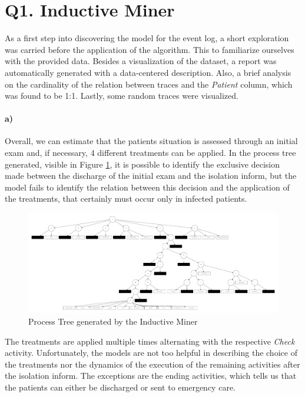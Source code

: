 \documentclass[12pt]{report}
\begin{document}
\section{Q1. Inductive Miner}

As a first step into discovering the model for the event log, a short exploration was carried before the application of the algorithm. This to familiarize ourselves with the provided data. Besides a visualization of the dataset, a report was automatically generated with a data-centered description. Also, a brief analysis on the cardinality of the relation between traces and the \emph{Patient} column, which was found to be 1:1. Lastly, some random traces were visualized.

\paragraph{a)} 

Overall, we can estimate that the patients situation is assessed through an initial exam and, if necessary, 4 different treatments can be applied. In the process tree generated, visible in Figure \ref{fig:figures-q1_a_tree-pdf}, it is possible to identify the exclusive decision made between the discharge of the initial exam and the isolation inform, but the model fails to identify the relation between this decision and the application of the treatments, that certainly must occur only in infected patients.

\begin{figure}[h]
    \centering
    \includegraphics[width=\textwidth]{figures/q1_a_tree.pdf}
    \caption{Process Tree generated by the Inductive Miner}
    \label{fig:figures-q1_a_tree-pdf}
\end{figure}

The treatments are applied multiple times alternating with the respective \emph{Check} activity. Unfortunately, the models are not too helpful in describing the choice of the treatments nor the dynamics of the execution of the remaining activities after the isolation inform. The exceptions are the ending activities, which tells us that the patients can either be discharged or sent to emergency care.
\end{document}
